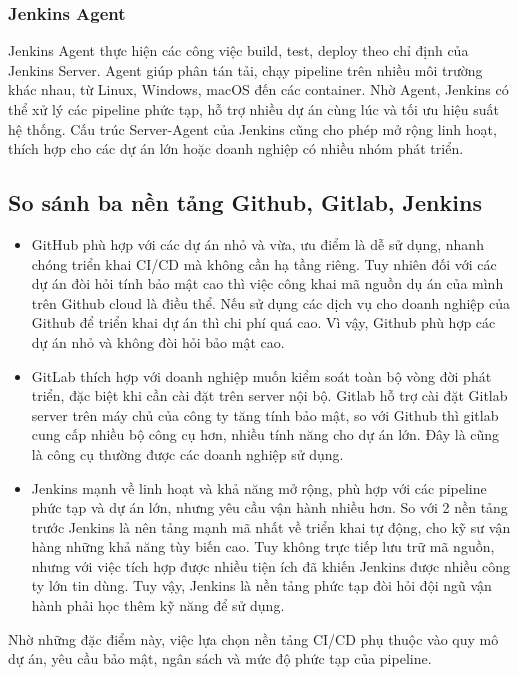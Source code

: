 \subsubsection{Jenkins Agent}
Jenkins Agent thực hiện các công việc build, test, deploy theo chỉ định của Jenkins Server. Agent giúp phân tán tải, chạy pipeline trên nhiều môi trường khác nhau, từ Linux, Windows, macOS đến các container. Nhờ Agent, Jenkins có thể xử lý các pipeline phức tạp, hỗ trợ nhiều dự án cùng lúc và tối ưu hiệu suất hệ thống. Cấu trúc Server-Agent của Jenkins cũng cho phép mở rộng linh hoạt, thích hợp cho các dự án lớn hoặc doanh nghiệp có nhiều nhóm phát triển.

\subsection{So sánh ba nền tảng Github, Gitlab, Jenkins}

\begin{itemize}
	\item GitHub phù hợp với các dự án nhỏ và vừa, ưu điểm là dễ sử dụng, nhanh chóng triển khai CI/CD mà không cần hạ tầng riêng. Tuy nhiên đối với các dự án đòi hỏi tính bảo mật cao thì việc công khai mã nguồn dụ án của mình trên Github cloud là điều thể. Nếu sử dụng các dịch vụ cho doanh nghiệp của Github để triển khai dự án thì chi phí quá cao. Vì vậy, Github phù hợp các dự án nhỏ và không đòi hỏi bảo mật cao.
	\item GitLab thích hợp với doanh nghiệp muốn kiểm soát toàn bộ vòng đời phát triển, đặc biệt khi cần cài đặt trên server nội bộ. Gitlab hỗ trợ  cài đặt Gitlab server trên máy chủ của công ty tăng tính bảo mật, so với Github thì gitlab cung cấp nhiều bộ công cụ hơn, nhiều tính năng cho dự án lớn. Đây là cũng là công cụ thường được các doanh nghiệp sử dụng.
	\item Jenkins mạnh về linh hoạt và khả năng mở rộng, phù hợp với các pipeline phức tạp và dự án lớn, nhưng yêu cầu vận hành nhiều hơn. So với 2 nền tảng trước Jenkins là nên tảng mạnh mã nhất về triển khai tự động, cho kỹ sư vận hàng những khả năng tùy biến cao. Tuy không trực tiếp lưu trữ mã nguồn, nhưng với việc tích hợp được nhiều tiện ích đã khiến Jenkins được nhiều công ty lớn tin dùng. Tuy vậy, Jenkins là nền tảng phức tạp đòi hỏi đội ngũ vận hành phải học thêm kỹ năng để sử dụng.
\end{itemize}

Nhờ những đặc điểm này, việc lựa chọn nền tảng CI/CD phụ thuộc vào quy mô dự án, yêu cầu bảo mật, ngân sách và mức độ phức tạp của pipeline.

